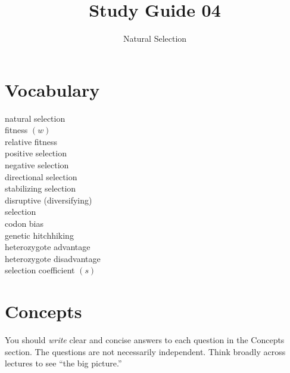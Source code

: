 \documentclass[letterpaper]{tufte-handout}
\title{Study Guide 04\hfill}
\author{Natural Selection}
\date{} %
\begin{document}
\maketitle	%


\section{Vocabulary} 
\vspace{-1\baselineskip}
\begin{multicols}{2}
natural selection\\
fitness $\left(w\right)$\\
relative fitness\\
positive selection\\
negative selection\\
directional selection\\
stabilizing selection\\
disruptive (diversifying)\\\hspace{1em}selection\\
codon bias\\
genetic hitchhiking\\
heterozygote advantage\\
heterozygote disadvantage\\
selection coefficient $\left(s\right)$
\end{multicols}

\section{Concepts}

You should \emph{write} clear and concise answers to each question in the Concepts section.  The questions are not necessarily independent.  Think broadly across lectures to see “the big picture.”
\end{document}
